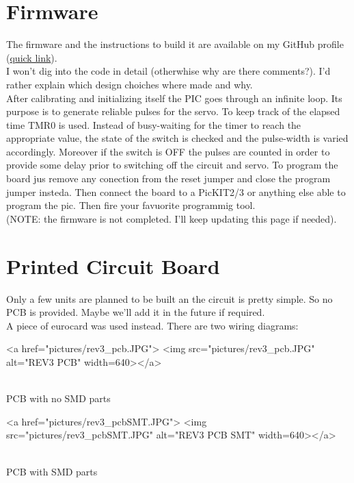 \documentclass{article}
\begin{document}
\section{Firmware}
The firmware and the instructions to build it are available on my GitHub profile (\href{https://github.com/electricant/ultimate_machine}{quick link}).
\\I won't dig into the code in detail (otherwhise why are there comments?). I'd rather explain which design choiches where made and why.
\\After calibrating and initializing itself the PIC goes through an infinite loop.
Its purpose is to generate reliable pulses for the servo.
To keep track of the elapsed time TMR0 is used.
Instead of busy-waiting for the timer to reach the appropriate value, the state of the switch is checked and the pulse-width is varied accordingly.
Moreover if the switch is OFF the pulses are counted in order to provide some delay prior to switching off the circuit and servo.
To program the board jus remove any conection from the reset jumper and close the program jumper insteda. Then connect the board to a PicKIT2/3 or anything else able to program the pic. Then fire your favuorite programmig tool.
\\(NOTE: the firmware is not completed. I'll keep updating this page if needed).

%
%
\section{Printed Circuit Board}
Only a few units are planned to be built an the circuit is pretty simple. So no PCB is provided. Maybe we'll add it in the future if required.
\\A piece of eurocard was used instead. There are two wiring diagrams:
\begin{center}
\begin{html}
<a href="pictures/rev3_pcb.JPG">
<img src="pictures/rev3_pcb.JPG" alt="REV3 PCB" width=640></a>
\end{html}
\\PCB with no SMD parts

\begin{html}
<a href="pictures/rev3_pcbSMT.JPG">
<img src="pictures/rev3_pcbSMT.JPG" alt="REV3 PCB SMT" width=640></a>
\end{html}
\\PCB with SMD parts
\end{center}
%
%
\end{document}
